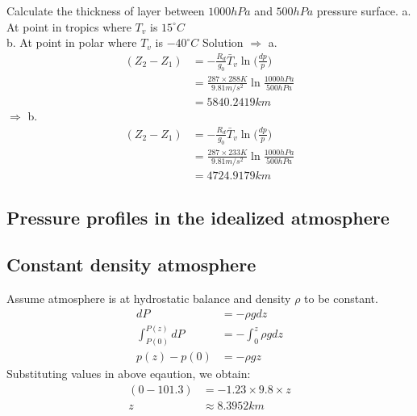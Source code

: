 \documentclass[fleqn,10pt]{SelfArx} %
\begin{document}
\begin{question}[label=q:8.2]{Calculate the thickness of layer between $1000hPa$ and $500hPa$ pressure surface.\newline
    a. At point in tropics where $T_v$ is $15^{\circ}C$ \\
    b. At point in polar where $T_v$ is $-40^{\circ}C$ 
}
Solution
 $\Rightarrow$  a. \begin{align*}
    (Z_2-Z_1) &= -\frac{R_d}{g_0}\bar{T}_v\ln\Big(\frac{dp}{p}\Big) \\
              &= \frac{287\times 288 K}{9.81 m/s^2} \ln\frac{1000 hPa}{500 hPa} \\
              &= 5840.2419km
    \end{align*}
 $\Rightarrow$  b. \begin{align*}
    (Z_2-Z_1) &= -\frac{R_d}{g_0}\bar{T}_v\ln\Big(\frac{dp}{p}\Big) \\
              &= \frac{287\times 233 K}{9.81 m/s^2} \ln\frac{1000 hPa}{500 hPa} \\
              &= 4724.9179km
    \end{align*}
\end{question}

\subsection*{Pressure profiles in the idealized atmosphere}

\subsection{Constant density atmosphere}
Assume atmosphere is at hydrostatic balance and density $\rho$ to be constant.
\begin{align}
    dP &= -\rho gdz \\ 
    \int^{P(z)}_{P(0)} dP &= -\int^{z}_{0} \rho g dz \\
    p(z)-p(0) &= -\rho gz
\end{align}
Substituting values in above eqaution, we obtain: 
\begin{align}
    (0 - 101.3) &= -1.23 \times 9.8 \times z \\
    z &\approx 8.3952 km
\end{align}
\end{document}
